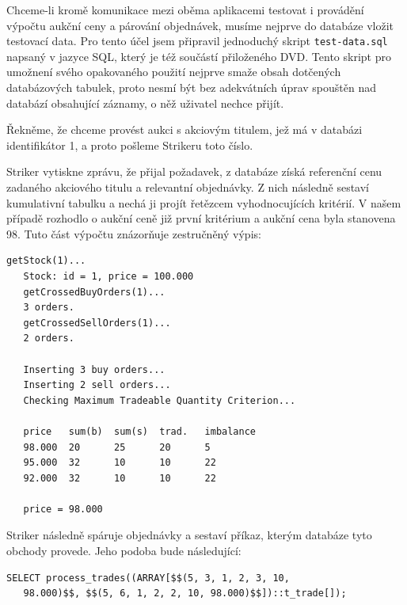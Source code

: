 \documentclass[thesis=M,czech]{FITthesis}[2012/06/26]
\begin{document}
Chceme-li kromě komunikace mezi oběma aplikacemi testovat i provádění výpočtu aukční ceny a párování objednávek, 
musíme nejprve do databáze vložit testovací data. Pro tento účel jsem připravil jednoduchý skript \texttt{test-data.sql}
napsaný v jazyce SQL, který je též součástí přiloženého DVD. Tento skript pro umožnení svého opakovaného použití 
nejprve smaže obsah dotčených databázových tabulek, proto nesmí být bez adekvátních úprav spouštěn nad databází 
obsahující záznamy, o něž uživatel nechce přijít.

Řekněme, že chceme provést aukci s akciovým titulem, jež má v databázi identifikátor 1, a proto pošleme Strikeru toto číslo.
 
Striker vytiskne zprávu, že přijal požadavek, z databáze získá referenční cenu zadaného akciového titulu a relevantní objednávky.
Z nich následně sestaví kumulativní tabulku a nechá ji projít řetězcem vyhodnocujících kritérií. V našem případě rozhodlo 
o aukční ceně již první kritérium a aukční cena byla stanovena 98. Tuto část výpočtu znázorňuje zestručněný výpis:

\begin{lstlisting}[basicstyle={\small\ttfamily}] 
   getStock(1)...                                                                  
   Stock: id = 1, price = 100.000                                                  
   getCrossedBuyOrders(1)...                                                       
   3 orders.                                                                                
   getCrossedSellOrders(1)...                                                               
   2 orders.                                                                                 

   Inserting 3 buy orders...
   Inserting 2 sell orders...
   Checking Maximum Tradeable Quantity Criterion...

   price   sum(b)  sum(s)  trad.   imbalance
   98.000  20      25      20      5
   95.000  32      10      10      22
   92.000  32      10      10      22

   price = 98.000
\end{lstlisting}

Striker následně spáruje objednávky a sestaví příkaz, kterým databáze tyto obchody provede. Jeho podoba bude následující: 

\begin{lstlisting}[basicstyle={\small\ttfamily}] 
   SELECT process_trades((ARRAY[$$(5, 3, 1, 2, 3, 10, 
   98.000)$$, $$(5, 6, 1, 2, 2, 10, 98.000)$$])::t_trade[]);
\end{lstlisting}
\end{document}
